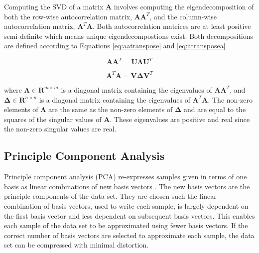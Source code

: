\documentclass[conference]{IEEEtran}
\begin{document}
    Computing the SVD of a matrix $\mathbf{A}$ involves computing the eigendecomposition of both the row-wise autocorrelation matrix, $\mathbf{AA}^T$, and the column-wise autocorrelation matrix, $\mathbf{A}^T\mathbf{A}$. Both autocorrelation matrices are at least positive semi-definite which means unique eigendecompostions exist. Both decompositions are defined according to Equations \ref{eq:aatranspose} and \ref{eq:atransposea}

    \begin{equation}
         \mathbf{AA}^{T} = \mathbf{U\Lambda}\mathbf{U}^T
    \label{eq:aatranspose}
    \end{equation}

    \begin{equation}
         \mathbf{A}^T\mathbf{A} = \mathbf{V\Delta}\mathbf{V}^T
    \label{eq:atransposea}
    \end{equation}
    
    where $\mathbf{\Lambda} \in \mathbf{R}^{m \times m}$ is a diagonal matrix containing the eigenvalues of $\mathbf{AA}^{T}$, and $\mathbf{\Delta} \in \mathbf{R}^{n \times n}$ is a diagonal matrix containing the eigenvalues of $\mathbf{A}^T\mathbf{A}$. The non-zero elements of $\mathbf{\Lambda}$ are the same as the non-zero elements of $\mathbf{\Delta}$ and are equal to the squares of the singular values of $\mathbf{A}$. These eigenvalues are positive and real since the non-zero singular values are real.
    
    \subsection{Principle Component Analysis}
    
    Principle component analysis (PCA) re-expresses samples given in terms of one basis as linear combinations of new basis vectors \cite{shlens_2014_tutorial}. The new basis vectors are the principle components of the data set. They are chosen such the linear combination of basis vectors, used to write each sample, is largely dependent on the first basis vector and less dependent on subsequent basis vectors. This enables each sample of the data set to be approximated using fewer basis vectors. If the correct number of basis vectors are selected to approximate each sample, the data set can be compressed with minimal distortion.
    
\end{document}
